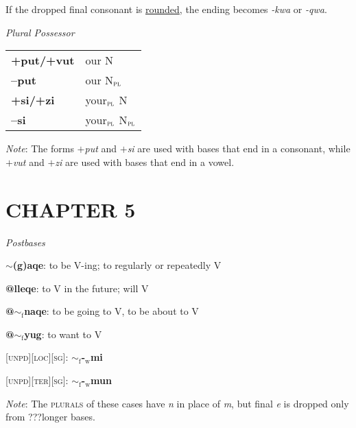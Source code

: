 \documentclass{article}
\begin{document}
If the dropped final consonant is \underline{rounded}, the ending becomes \textit{-kwa} or \textit{-qwa}.

\bigskip

\textit{Plural Possessor} \\
\begin{tabular}{ l l }
\textbf{+put/+vut} & our N \\
\textbf{--put} & our N$_\text{\textsc{pl}}$ \\
\textbf{+si/+zi} & your$_\text{\textsc{pl}}$ N \\
\textbf{--si} & your$_\text{\textsc{pl}}$ N$_\text{\textsc{pl}}$ \\
\end{tabular}

\textit{Note}: The forms \textit{$+$put} and \textit{$+$si} are used with bases that end in a consonant, while \textit{$+$vut} and \textit{$+$zi} are used with bases that end in a vowel.

\section*{CHAPTER 5}

\textit{Postbases}
\begin{description}
\item \textbf{$\sim$(g)aqe}: to be V-ing; to regularly or repeatedly V
\item \textbf{@lleqe}: to V in the future; will V
\item \textbf{@$\sim_\text{f}$naqe}: to be going to V, to be about to V
\item \textbf{@$\sim_\text{f}$yug}: to want to V
\end{description}

\bigskip

\textsc{[unpd][loc][sg]}: \textbf{$\sim_\text{f}$-$_\text{w}$mi}

\textsc{[unpd][ter][sg]}: \textbf{$\sim_\text{f}$-$_\text{w}$mun}

\textit{Note}: The \textsc{plurals} of these cases have \textit{n} in place of \textit{m}, but final \textit{e} is dropped only from ???longer bases.

\bigskip
\end{document}
